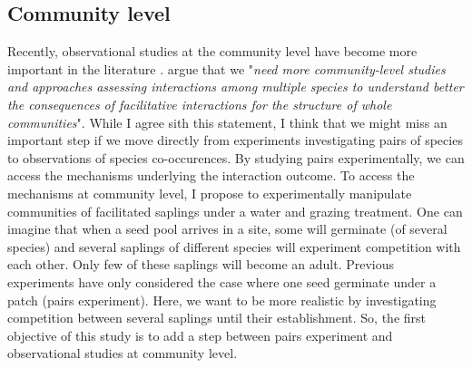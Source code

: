 \documentclass[12pt]{article} %
\begin{document}
\subsection{Community level}
Recently, observational studies at the community level have become more important in the literature \citep{Soliveres2012, Gross2013, Soliveres2014b}. %
\citet{Soliveres2014} argue that we "\textit{need more community-level studies and approaches assessing interactions among multiple species to understand better the consequences of facilitative interactions for the structure of whole communities}". 
While I agree sith this statement, I think that we might miss an important step if we move directly from experiments investigating pairs of species to observations of species co-occurences. By studying pairs experimentally, we can access the mechanisms underlying the interaction outcome. 
To access the mechanisms at community level, I propose to experimentally manipulate communities of facilitated saplings under a water and grazing treatment.
One can imagine that when a seed pool arrives in a site, some will germinate (of several species) and several saplings of different species will experiment competition with each other. Only few of these saplings will become an adult. Previous experiments have only considered the case where one seed germinate under a patch (pairs experiment). Here, we want to be more realistic by investigating competition between several saplings until their establishment. So, the first objective of this study is to add a step between pairs experiment and observational studies at community level.
\end{document}

